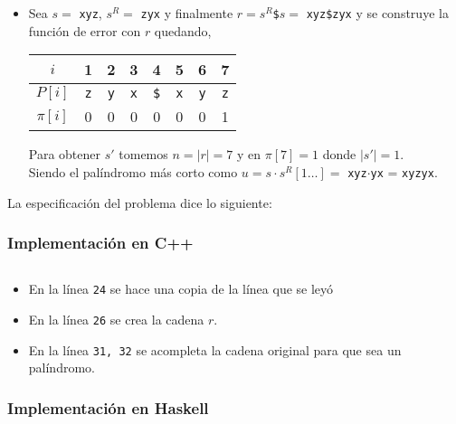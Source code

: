 \begin{itemize}
\item Sea $s = $ \texttt{xyz}, $s^R =$ \texttt{zyx} y finalmente
$r = s^R$\texttt{\$}$s =$ \texttt{xyz\$zyx} y se construye la función de error con $r$ quedando,

\begin{table}[H]
\centering
\begin{tabular}{c|c|c|c|c|c|c|c|}
\cline{2-8}
$i$      & 1          & 2          & 3          & 4           & 5          & 6          & 7          \\ \hline
$P[i]$   & \texttt{z} & \texttt{y} & \texttt{x} & \texttt{\$} & \texttt{x} & \texttt{y} & \texttt{z} \\ \hline
$\pi[i]$ & 0          & 0          & 0          & 0           & 0          & 0          & 1          \\ \cline{2-8} 
\end{tabular}
\end{table}
Para obtener $s'$ tomemos $n = \vert r \vert = 7$ y en $\pi[7] = 1$ donde $\vert s' \vert = 1$.\\
Siendo el palíndromo más corto como
$u = s \cdot s^R[1 \ldots] =$ \texttt{xyz}$\cdot$\texttt{yx} = \texttt{xyzyx}.

\end{itemize}

La especificación del problema dice lo siguiente:


\subsubsection{Implementación en C++}
\inputminted[linenos, frame=lines]{cpp}{problemas/cpp/EPALIN.cpp}

\begin{itemize}
\item En la línea \texttt{24} se hace una copia de la línea que se leyó
\item En la línea \texttt{26} se crea la cadena $r$.
\item En la línea \texttt{31, 32} se acompleta la cadena original para que sea un palíndromo.
\end{itemize}

\subsubsection{Implementación en Haskell}
\inputminted[linenos, frame=lines]{haskell}{problemas/haskell/EPALIN.hs}

